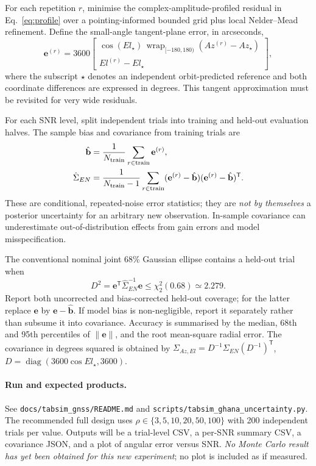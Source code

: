 \documentclass[11pt,a4paper]{article}
\begin{document}
For each repetition $r$, minimise the complex-amplitude-profiled
residual in Eq.~\eqref{eq:profile} over a pointing-informed bounded
grid plus local Nelder--Mead refinement. Define the small-angle
tangent-plane error, in arcseconds,
\begin{equation}
\mathbf e^{(r)}=
3600\begin{bmatrix}
\cos(El_\star)\,\operatorname{wrap}_{[-180,180)}(Az^{(r)}-Az_\star)\\
El^{(r)}-El_\star
\end{bmatrix},
\end{equation}
where the subscript $\star$ denotes an independent orbit-predicted
reference and both coordinate differences are expressed in degrees.
This tangent approximation must be revisited for very wide residuals.

For each SNR level, split independent trials into training and
held-out evaluation halves. The sample bias and covariance from
training trials are
\begin{align}
\hat{\mathbf b}
&=\frac1{N_{\rm train}}\sum_{r\in{\rm train}}\mathbf e^{(r)},\\
\hat{\Sigma}_{EN}
&=\frac1{N_{\rm train}-1}\sum_{r\in{\rm train}}
(\mathbf e^{(r)}-\hat{\mathbf b})
(\mathbf e^{(r)}-\hat{\mathbf b})^\mathsf T.
\end{align}
These are conditional, repeated-noise error statistics; they are
\emph{not by themselves} a posterior uncertainty for an arbitrary
new observation. In-sample covariance can underestimate
out-of-distribution effects from gain errors and model misspecification.

The conventional nominal joint 68\% Gaussian ellipse contains
a held-out trial when
\begin{equation}
D^2=\mathbf e^\mathsf{T}\hat{\Sigma}_{EN}^{-1}\mathbf e
\le \chi^2_{2}(0.68)\simeq2.279.
\end{equation}
Report both uncorrected and bias-corrected held-out coverage;
for the latter replace $\mathbf e$ by
$\mathbf e-\hat{\mathbf b}$. If model bias is non-negligible,
report it separately rather than subsume it into covariance.
Accuracy is summarised by the median, 68th and 95th percentiles of
$\|\mathbf e\|$, and the root mean-square radial error.
The covariance in degrees squared is obtained by
$\Sigma_{Az,El}=D^{-1}\Sigma_{EN}(D^{-1})^\mathsf T$,
$D=\operatorname{diag}(3600\cos El_\star,3600)$.

\paragraph{Run and expected products.}
See \texttt{docs/tabsim\_gnss/README.md} and
\texttt{scripts/tabsim\_ghana\_uncertainty.py}. The recommended full
design uses $\rho\in\{3,5,10,20,50,100\}$ with 200 independent
trials per value. Outputs will be a trial-level CSV, a per-SNR
summary CSV, a covariance JSON, and a plot of angular error versus
SNR. \emph{No Monte Carlo result has yet been obtained for this
new experiment}; no plot is included as if measured.
\end{document}
